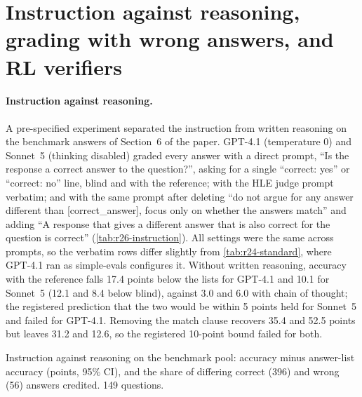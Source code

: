 \FloatBarrier
\section{Instruction against reasoning, grading with wrong answers, and RL verifiers}
\label{app:r26}

\paragraph{Instruction against reasoning.} A pre-specified experiment separated the instruction from written reasoning on the benchmark answers of Section~6 of the paper. GPT-4.1 (temperature 0) and Sonnet~5 (thinking disabled) graded every answer with a direct prompt, ``Is the response a correct answer to the question?'', asking for a single ``correct: yes'' or ``correct: no'' line, blind and with the reference; with the HLE judge prompt verbatim; and with the same prompt after deleting ``do not argue for any answer different than [correct\_answer], focus only on whether the answers match'' and adding ``A response that gives a different answer that is also correct for the question is correct'' (\cref{tab:r26-instruction}). All settings were the same across prompts, so the verbatim rows differ slightly from \cref{tab:r24-standard}, where GPT-4.1 ran as simple-evals configures it. Without written reasoning, accuracy with the reference falls 17.4 points below the lists for GPT-4.1 and 10.1 for Sonnet~5 (12.1 and 8.4 below blind), against 3.0 and 6.0 with chain of thought; the registered prediction that the two would be within 5 points held for Sonnet~5 and failed for GPT-4.1. Removing the match clause recovers 35.4 and 52.5 points but leaves 31.2 and 12.6, so the registered 10-point bound failed for both.

\begin{table}[htbp]
\centering
\caption{Instruction against reasoning on the benchmark pool: accuracy minus answer-list accuracy (points, 95\% CI), and the share of differing correct (396) and wrong (56) answers credited. 149 questions.\pre}
\label{tab:r26-instruction}
\footnotesize
\setlength{\tabcolsep}{3pt}
\begin{adjustbox}{max width=\linewidth}\end{adjustbox}
\end{table}

